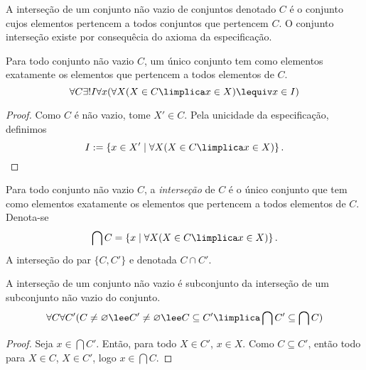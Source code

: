 A interseção de um conjunto não vazio de conjuntos denotado $C$ é o conjunto cujos elementos pertencem a todos conjuntos que pertencem $C$. O conjunto interseção existe por consequêcia do axioma da especificação.

\begin{prop}
Para todo conjunto não vazio $C$, um único conjunto tem como elementos exatamente os elementos que pertencem a todos elementos de $C$.
	\begin{equation*}
	\forall C \exists! I \forall x(\forall X(X \in C \limplica x \in X) \lequiv x \in I)
	\end{equation*}
\end{prop}
\begin{proof}
Como $C$ é não vazio, tome $X' \in C$. Pela unicidade da especificação, definimos
	\begin{equation*}
	I := \set{x \in X'}{\forall X(X \in C \limplica x \in X)}. \qedhere
	\end{equation*}
\end{proof}

\begin{defi}
Para todo conjunto não vazio $C$, a \emph{interseção} de $C$ é o único conjunto que tem como elementos exatamente os elementos que pertencem a todos elementos de $C$. Denota-se
	\begin{equation*}
	\bigcap C = \set{x}{\forall X(X \in C \limplica x \in X)}.
	\end{equation*}
A interseção do par $\{C,C'\}$ e denotada $C \cap C'$.
\end{defi}

\begin{prop}
A interseção de um conjunto não vazio é subconjunto da interseção de um subconjunto não vazio do conjunto.
	\begin{equation*}
	\forall C \forall C' (C \neq \emptyset \lee C' \neq \emptyset \lee C \subseteq C' \limplica \bigcap C' \subseteq \bigcap C)
	\end{equation*}
\end{prop}
\begin{proof}
Seja $x \in \bigcap C'$. Então, para todo $X \in C'$, $x \in X$. Como $C \subseteq C'$, então todo para $X \in C$, $X \in C'$, logo $x \in \bigcap C$.
\end{proof}

